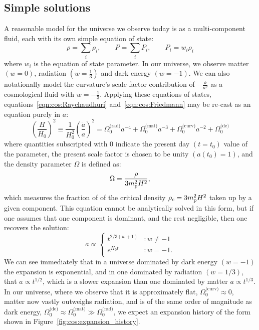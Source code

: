 \subsection{Simple solutions}
A reasonable model for the universe we observe today is as a multi-component fluid, each with its own simple equation of state:
\begin{equation}
  \rho = \sum_i \rho_i, \qquad P = \sum_i P_i, \qquad P_i = w_i \rho_i
  \label{eqn:cos:multi_component}
\end{equation}
where $w_i$ is the equation of state parameter. In our universe, we observe matter $(w=0)$, radiation $(w=\frac{1}{3})$ and dark energy $(w=-1)$. We can also notationally model the curvature's scale-factor contribution of $-\frac{k}{a^2}$ as a cosmological fluid with $w=-\frac{1}{3}$. Applying these equations of states, equations~\eqref{eqn:cos:Raychaudhuri} and~\eqref{eqn:cos:Friedmann} may be re-cast as an equation purely in $a$:
\begin{equation}
  {\left( \frac{H}{H_0} \right)}^2 \equiv 
  \frac{1}{H_0^2}{\left( \frac{\dot{a}}{a} \right)}^2 =
  \Omega^\text{(rad)}_0 a^{-4} +
  \Omega^\text{(mat)}_0 a^{-3} + 
  \Omega^\text{(curv)}_0 a^{-2} +
  \Omega^\text{(de)}_0  
  \label{eqn:cos:expansion_history}
\end{equation}
where quantities subscripted with $0$ indicate the present day $(t=t_0)$ value of the parameter, the present scale factor is chosen to be unity $(a(t_0)=1)$, and the density parameter $\Omega$ is defined as:
\begin{equation}
  \Omega = \frac{\rho}{3m_{\mathrm{p}}^2H^2},
\end{equation}
which measures the fraction of of the critical density $\rho_c = 3m_{\mathrm{p}}^2H^2$ taken up by a given component. This equation cannot be analytically solved in this form, but if one assumes that one component is dominant, and the rest negligible, then one recovers the solution:
\begin{equation}
  a  \propto
  \left\{
  \begin{array}{ll}
    t^{2/3(w+1)} &: w\ne-1\\
    e^{H_0 t} &: w=-1.\\
  \end{array}
  \right.
\end{equation}
We can see immediately that in a universe dominated by dark energy $(w=-1)$ the expansion is exponential, and in one dominated by radiation $(w=1/3)$, that $a\propto t^{1/2}$, which is a slower expansion than one dominated by matter $a\propto t^{1/3}$. In our universe, where we observe that it is approximately flat, $\Omega_0^{\text{(curv)}}\approx0$, matter now vastly outweighs radiation, and is of the same order of magnitude as dark energy, ${\Omega_0^{\text{(de)}} \approx \Omega_0^{\text{(mat)}} \gg \Omega_0^{\text{(rad)}}}$, we expect an expansion history of the form shown in Figure~\ref{fig:cos:expansion_history}.

